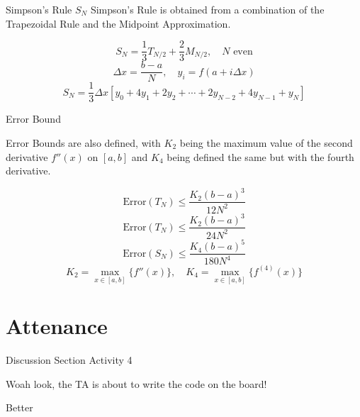 \documentclass{beamer}
\begin{document}
\begin{frame}{Simpson's Rule $S_N$}
    Simpson's Rule is obtained from a combination of the Trapezoidal Rule and the Midpoint Approximation. 

    \[
        S_N = \frac{1}{3}T_{N/2} + \frac{2}{3}M_{N/2}, \quad N \text{ even}
    \]
    \[
        \Delta x = \frac{b-a}{N}, \quad  y_i = f(a + i\Delta x)
    \]
    \[
        S_N = \frac{1}{3}\Delta x [y_0 + 4y_1 + 2y_2  + \cdots + 2y_{N-2} + 4y_{N-1} + y_N]
    \]
    
\end{frame}

\begin{frame}{Error Bound}

    Error Bounds are also defined, with $K_2$ being the maximum value of the second derivative $f''(x)$ on $[a, b]$ and $K_4$ being defined the same but with the fourth derivative. 

    \[
        \text{Error}(T_N) \le \frac{K_2(b-a)^3}{12N^2}
    \]
    \[
        \text{Error}(T_N) \le \frac{K_2(b-a)^3}{24N^2}
    \]
    \[
        \text{Error}(S_N) \le \frac{K_4(b-a)^5}{180N^4}
    \]
    \[
        K_2 = \max_{x \in [a, b]}\{f''(x)\}, \quad K_4 = \max_{x \in [a, b]}\{f^{(4)}(x)\}
    \]


\end{frame}


\section{Attenance}
\begin{frame}{Discussion Section Activity 4}
    \raggedright
    Woah look, the TA is about to write the code on the board!
\end{frame}

\begin{frame}

Better

\end{frame}
\end{document}
